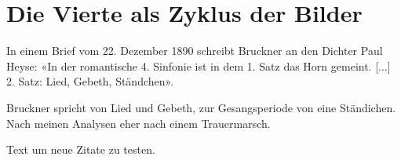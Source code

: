 \section{Die Vierte als Zyklus der Bilder}

In einem Brief vom 22. Dezember 1890 schreibt Bruckner an den Dichter Paul Heyse: «In der romantische 4. Sinfonie ist in dem 1. Satz das Horn gemeint. [...] 2. Satz: Lied, Gebeth, Ständchen».\autocite{heinze:bruckner}

Bruckner spricht von Lied und Gebeth, zur Gesangsperiode von eine Ständichen.
Nach meinen Analysen eher nach einem Trauermarsch.

Text um neue\autocite{roeder:bruckner} Zitate\autocite{heinze:bruckner} zu testen.
